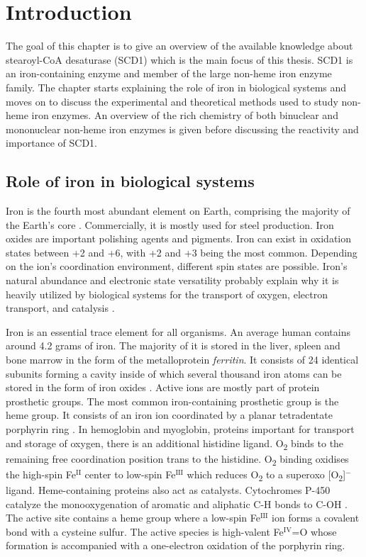 \chapter{Introduction}
The goal of this chapter is to give an overview of the available knowledge about stearoyl-CoA desaturase (SCD1) which is the main focus of this thesis. SCD1 is an iron-containing enzyme and member of the large non-heme iron enzyme family. The chapter starts  explaining the role of iron in biological systems and moves on to discuss the experimental and theoretical methods used to study non-heme iron enzymes. An overview of the rich chemistry of both binuclear and mononuclear non-heme iron enzymes is given before discussing the reactivity and importance of SCD1.

\section{Role of iron in biological systems}
Iron is the fourth most abundant element on Earth, comprising the majority of the Earth's core \cite{inorganic_chemistry_book}. Commercially, it is mostly used for steel production. Iron oxides are important polishing agents and pigments. Iron can exist in oxidation states between +2 and +6, with +2 and +3 being the most common. Depending on the ion's coordination environment, different spin states are possible. Iron's natural abundance and electronic state versatility probably explain why it is heavily utilized by biological systems for the transport of oxygen, electron transport, and catalysis \cite{Frey2012}.

Iron is an essential trace element for all organisms. An average human contains around 4.2 grams of iron. The majority of it is stored in the liver, spleen and bone marrow in the form of the metalloprotein \textit{ferritin}. It consists of 24 identical subunits forming a cavity inside of which several thousand iron atoms can be stored in the form of iron oxides \cite{Harrison1996}. Active ions are mostly part of protein prosthetic groups. The most common iron-containing prosthetic group is the heme group. It consists of an iron ion coordinated by a planar tetradentate porphyrin ring \cite{Lehninger}. In hemoglobin and myoglobin, proteins important for transport and storage of oxygen, there is an additional histidine ligand. O\textsubscript{2} binds to the remaining free coordination position trans to the histidine. O\textsubscript{2} binding oxidises the high-spin Fe$^{\mathrm{II}}$ center to low-spin Fe$^{\mathrm{III}}$ which reduces O\textsubscript{2} to a superoxo [O\textsubscript{2}]$^{-}$ ligand. Heme-containing proteins also act as catalysts. Cytochromes P-450 catalyze the monooxygenation of aromatic and aliphatic C-H bonds to C-OH \cite{Denisov2005}. The active site contains a heme group where a low-spin Fe$^{\mathrm{III}}$ ion forms a covalent bond with a cysteine sulfur. The active species is high-valent Fe$^{\mathrm{IV}}$=O whose formation is accompanied with a one-electron oxidation of the porphyrin ring.

